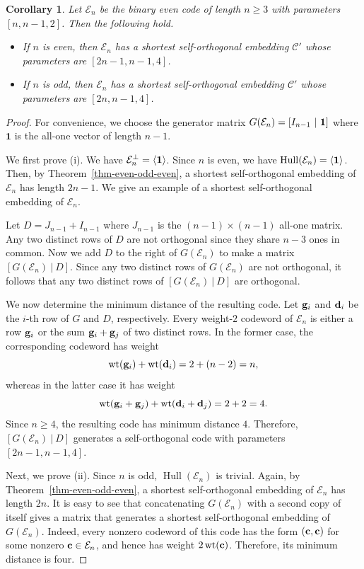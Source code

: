 \documentclass{article}
\newtheorem{cor}[theorem]{Corollary}
\theoremstyle{definition}
\theoremstyle{remark}
\newcommand{\Hull}{\operatorname{Hull}}
\newcommand{\wt}{\operatorname{wt}}
\begin{document}
\begin{cor}\label{cor-emb-en}
 Let $\mathcal E_n$ be the binary even code of length $n\ge 3$ with parameters $[n, n-1, 2]$. Then the following hold.

\begin{itemize}

\item[{(i)}] If $n$ is even, then $\mathcal E_n$ has a shortest self-orthogonal embedding $\mathcal C'$ whose parameters are $[2n-1, n-1, 4]$.

\item[{(ii)}] If $n$ is odd, then $\mathcal E_n$ has a shortest self-orthogonal embedding $\mathcal C'$ whose parameters are $[2n, n-1, 4]$.
\end{itemize}
\end{cor}

\begin{proof}
 For convenience, we choose the generator matrix $G(\mathcal E_n) = [I_{n-1}~|~ {\bf{1}}]$ where $\mathbf{1}$ is the all-one vector of length $n-1$.

We first prove (i). We have $\mathcal E_n^\perp = \langle{\bf 1}\rangle$.  Since $n$ is even, we have $\Hull(\mathcal E_n) = \langle{\bf 1}\rangle$. Then, by Theorem~\ref{thm-even-odd-even}, a shortest self-orthogonal embedding of $\mathcal{E}_n$ has length $2n-1$. We give an example of a shortest self-orthogonal embedding of $\mathcal{E}_n$.

Let $D=J_{n-1}+I_{n-1}$ where $J_{n-1}$ is the $(n-1)\times (n-1)$ all-one matrix. Any two distinct rows of $D$ are not orthogonal since they share $n-3$ ones in common. Now we add $D$ to the right of $G(\mathcal E_n)$ to make a matrix $[G(\mathcal E_n)~|~ D]$. Since any two distinct rows of $G(\mathcal E_n)$ are not orthogonal, it follows that any two distinct rows of $[G(\mathcal E_n)~|~ D]$ are orthogonal.

We now determine the minimum distance of the resulting code. Let ${\bf g}_i$ and ${\bf d}_i$ be the $i$-th row of $G$ and $D$, respectively. Every weight-$2$ codeword of $\mathcal E_n$ is either a row ${\bf g}_i$ or the sum ${\bf g}_i+{\bf g}_j$ of two distinct
rows. In the former case, the corresponding codeword has weight
\[
\wt({\bf g}_i)+\wt({\bf d}_i)=2+(n-2)=n,
\]
whereas in the latter case it has weight
\[
\wt({\bf g}_i+{\bf g}_j)+\wt({\bf d}_i+{\bf d}_j)=2+2=4.
\]
Since $n\ge4$, the resulting code has minimum distance $4$. Therefore, $[G(\mathcal E_n)~|~ D]$ generates a self-orthogonal code with parameters $[2n-1, n-1, 4]$.

Next, we prove (ii). Since $n$ is odd, $\Hull(\mathcal E_n)$ is trivial. Again, by Theorem~\ref{thm-even-odd-even}, a shortest self-orthogonal embedding of $\mathcal{E}_n$ has length $2n$. It is easy to see that concatenating $G(\mathcal{E}_n)$ with a second copy of itself gives a matrix that generates a shortest self-orthogonal embedding of $G(\mathcal{E}_n)$. Indeed, every nonzero
codeword of this code has the form $({\bf c},{\bf c})$ for some
nonzero ${\bf c}\in\mathcal E_n$, and hence has weight
$2\wt({\bf c})$. Therefore, its minimum distance is four.
\end{proof}
\end{document}
